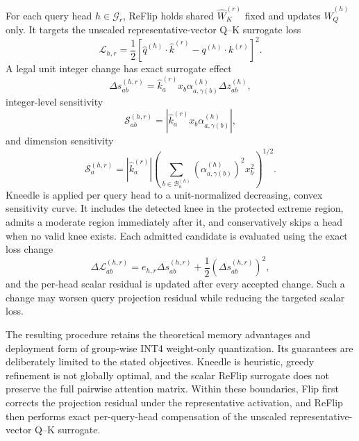 For each query head $h\in\mathcal{G}_r$, ReFlip holds shared $\hat W_K^{(r)}$ fixed and updates $\hat W_Q^{(h)}$ only. It targets the unscaled representative-vector Q--K surrogate loss
\begin{equation}
\mathcal{L}_{h,r}
=\frac{1}{2}
\left[
\hat q^{(h)}\cdot\hat k^{(r)}
-
q^{(h)}\cdot k^{(r)}
\right]^2.
\end{equation}
A legal unit integer change has exact surrogate effect
\begin{equation}
\Delta s^{(h,r)}_{ab}
=
\hat k^{(r)}_a x_b
\alpha^{(h)}_{a,\gamma(b)}
\Delta z^{(h)}_{ab},
\end{equation}
integer-level sensitivity
\begin{equation}
\mathcal{S}^{(h,r)}_{ab}
=
\left|
\hat k^{(r)}_a x_b\alpha^{(h)}_{a,\gamma(b)}
\right|,
\end{equation}
and dimension sensitivity
\begin{equation}
\mathcal{S}^{(h,r)}_a
=
\left|\hat k^{(r)}_a\right|
\left(
\sum_{b\in\mathcal{B}^{(h)}_a}
\left(\alpha^{(h)}_{a,\gamma(b)}\right)^2x_b^2
\right)^{1/2}.
\end{equation}
Kneedle is applied per query head to a unit-normalized decreasing, convex sensitivity curve. It includes the detected knee in the protected extreme region, admits a moderate region immediately after it, and conservatively skips a head when no valid knee exists. Each admitted candidate is evaluated using the exact loss change
\begin{equation}
\Delta\mathcal{L}^{(h,r)}_{ab}
=
e_{h,r}\Delta s^{(h,r)}_{ab}
+\frac{1}{2}\left(\Delta s^{(h,r)}_{ab}\right)^2,
\end{equation}
and the per-head scalar residual is updated after every accepted change. Such a change may worsen query projection residual while reducing the targeted scalar loss.

{\raggedright
The resulting procedure retains the theoretical memory advan\-tages and deploy\-ment form of group-wise INT4 weight-only quantization. Its guarantees are deliberately limited to the stated objectives. Kneedle is heuristic, greedy refinement is not globally optimal, and the scalar ReFlip surrogate does not preserve the full pairwise attention matrix. Within these boundaries, Flip first corrects the projection residual under the representative activation, and ReFlip then performs exact per-query-head compensation of the unscaled representative-vector Q--K surrogate.
\par}
